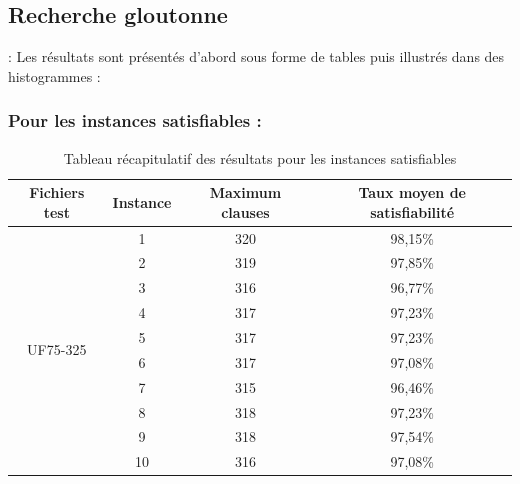 
\newpage
\subsection{Recherche gloutonne} :
Les résultats sont présentés d'abord sous forme de tables puis illustrés dans des histogrammes : 
\subsubsection{Pour les instances satisfiables :}
\begin{table}[H]
	\centering
	\begin{tabular}{|c|c|c|c|}
		\hline
		Fichiers test              & Instance & Maximum clauses & Taux moyen de satisfiabilité \\ \hline
		\multirow{10}{*}{UF75-325} & 1        & 320             & 98,15\%                      \\ \cline{2-4} 
		& 2        & 319             & 97,85\%                      \\ \cline{2-4} 
		& 3        & 316             & 96,77\%                      \\ \cline{2-4} 
		& 4        & 317             & 97,23\%                      \\ \cline{2-4} 
		& 5        & 317             & 97,23\%                      \\ \cline{2-4} 
		& 6        & 317             & 97,08\%                      \\ \cline{2-4} 
		& 7        & 315             & 96,46\%                      \\ \cline{2-4} 
		& 8        & 318             & 97,23\%                      \\ \cline{2-4} 
		& 9        & 318             & 97,54\%                      \\ \cline{2-4} 
		& 10       & 316             & 97,08\%                      \\ \hline
	\end{tabular}
	\caption{Tableau récapitulatif des résultats pour les instances satisfiables}
	\label{table:Tab_Greedy_Sat}
\end{table}
